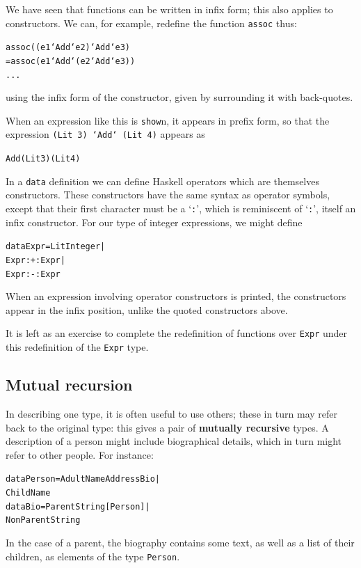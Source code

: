 We have seen that functions can be written in infix form; this also applies to
constructors. We can, for example, redefine the function \texttt{assoc} thus:
\begin{alltt}
assoc ((e1 `Add` e2) `Add` e3)
  = assoc (e1 `Add` (e2 `Add` e3))
 ...
\end{alltt}
using the infix form of the constructor, given by surrounding it with
back-quotes. 

When an expression like this is \texttt{show}n, it appears in prefix
form, so that the expression \texttt{(Lit 3) `Add` (Lit 4)} appears as
\begin{alltt}
Add (Lit 3) (Lit 4)
\end{alltt}
In a \texttt{data}
definition we can define Haskell operators which are themselves constructors. 
These constructors have the same syntax as
operator symbols, except that their first character must be a `\texttt{:}', which
is reminiscent of `\texttt{:}', itself an infix constructor. For our type of
integer expressions, we might define
\begin{alltt}
data Expr = Lit Integer |
            Expr :+: Expr |
            Expr :-: Expr
\end{alltt}
When an expression involving operator constructors is printed, the
constructors appear in the infix position, unlike the quoted constructors
above.

It is left as an exercise to complete the redefinition of functions over 
\texttt{Expr} under this redefinition of the \texttt{Expr} type.

\subsection*{Mutual recursion}

In describing one type, it is often useful to use others; these in turn may
refer back to the original type: this gives a pair of \textbf{mutually
recursive} types. A description of a person might include biographical
details,
which in turn might refer to other people. For instance: 
\begin{alltt}
data Person = Adult Name Address Bio |
              Child Name
data Bio    = Parent String [Person] |
              NonParent String
\end{alltt}
In the case of a
parent, the biography contains some text, as well as a list of their children,
as elements of the type \texttt{Person}.

